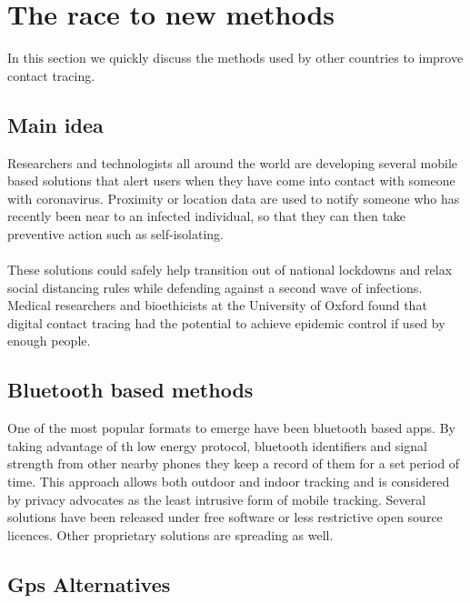 {\color{PineGreen}\section{The race to new methods}}

In this section we quickly discuss the methods used by other countries to improve contact tracing.

{\color{PineGreen}\subsection{Main idea}}

Researchers and technologists all around the world are developing several mobile based solutions that alert users when they have come into contact with someone with coronavirus. Proximity or location data are used to notify someone who has recently been near to an infected individual, so that they can then take preventive action such as self-isolating.\\
\\
These solutions could safely help transition out of national lockdowns and relax social distancing rules while defending against a second wave of infections. Medical researchers and bioethicists at the University of Oxford found that digital contact tracing had the potential to achieve epidemic control if used by enough people.
\\
{\color{PineGreen}\subsection{Bluetooth based methods}}
One of the most popular formats to emerge have been bluetooth based apps. By taking advantage of th low energy protocol, bluetooth identifiers and signal strength from other nearby phones they keep a record of them for a set period of time. This approach allows both outdoor and indoor tracking and is considered by privacy advocates as the least intrusive form of mobile tracking.
Several solutions have been released under free software or less restrictive open source licences. Other proprietary solutions are spreading as well. 
\\
{\color{PineGreen}\subsection{Gps Alternatives}}

